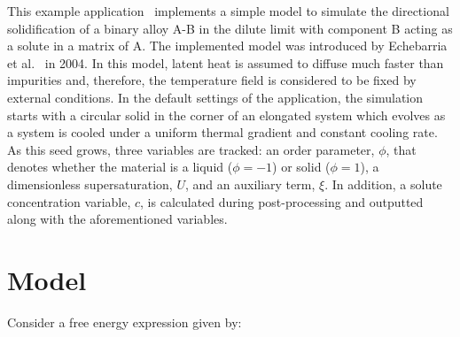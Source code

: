 \documentclass[10pt]{article}
\begin{document}
This example application~\cite{Yao2021} implements a simple model to simulate the directional solidification of a binary alloy A-B in the dilute limit with component B acting as a solute in a matrix of A. The implemented model was introduced by Echebarria et al.~\cite{Echebarria2004} in 2004. In this model, latent heat is assumed to diffuse much faster than impurities and, therefore, the temperature field is considered to be fixed by external conditions. In the default settings of the application, the simulation starts with a circular solid in the corner of an elongated system which evolves as a system is cooled under a uniform thermal gradient and constant cooling rate. As this seed grows, three variables are tracked: an order parameter, $\phi$, that denotes whether the material is a liquid ($\phi=-1$) or solid ($\phi=1$), a dimensionless supersaturation, $U$, and an auxiliary term, $\xi$. In addition, a solute concentration variable, $c$, is calculated during post-processing and outputted along with the aforementioned variables.

\section{Model}
Consider a free energy expression given by:
\end{document}
